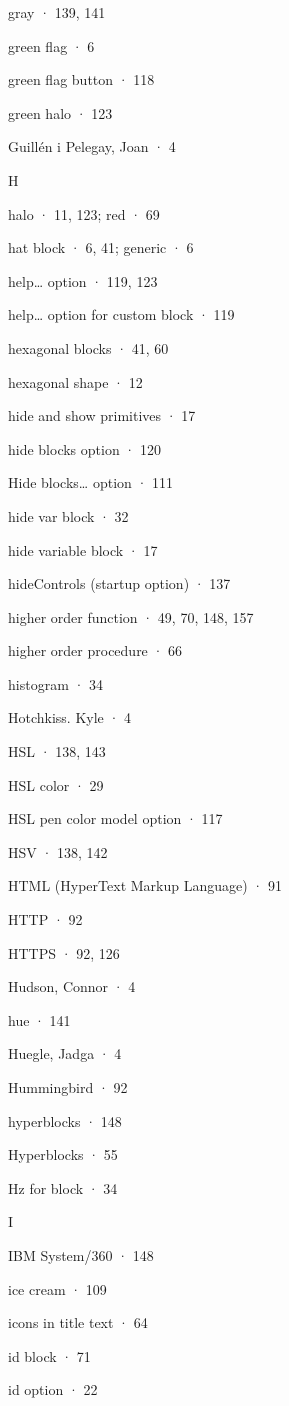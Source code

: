 \documentclass[
  letterpaper,
]{book}
\begin{document}
gray · 139, 141

green flag · 6

green flag button · 118

green halo · 123

Guillén i Pelegay, Joan · 4

H

halo · 11, 123; red · 69

hat block · 6, 41; generic · 6

help\ldots{} option · 119, 123

help\ldots{} option for custom block · 119

hexagonal blocks · 41, 60

hexagonal shape · 12

hide and show primitives · 17

hide blocks option · 120

Hide blocks\ldots{} option · 111

hide var block · 32

hide variable block · 17

hideControls (startup option) · 137

higher order function · 49, 70, 148, 157

higher order procedure · 66

histogram · 34

Hotchkiss. Kyle · 4

HSL · 138, 143

HSL color · 29

HSL pen color model option · 117

HSV · 138, 142

HTML (HyperText Markup Language) · 91

HTTP · 92

HTTPS · 92, 126

Hudson, Connor · 4

hue · 141

Huegle, Jadga · 4

Hummingbird · 92

hyperblocks · 148

Hyperblocks · 55

Hz for block · 34

I

IBM System/360 · 148

ice cream · 109

icons in title text · 64

id block · 71

id option · 22
\end{document}
